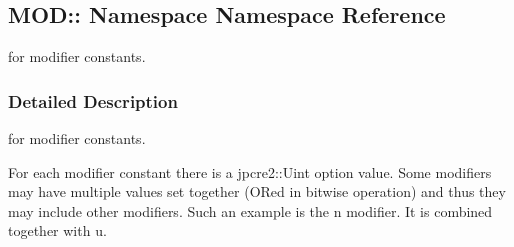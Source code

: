 \hypertarget{namespaceMOD_1_1
Namespace}{}\subsection{M\+OD\+:\+: Namespace Namespace Reference}
\label{namespaceMOD_1_1
Namespace}


for modifier constants.  




\subsubsection{Detailed Description}
for modifier constants. 

For each modifier constant there is a jpcre2\+::\+Uint option value. Some modifiers may have multiple values set together (O\+Red in bitwise operation) and thus they may include other modifiers. Such an example is the \textquotesingle{}n\textquotesingle{} modifier. It is combined together with \textquotesingle{}u\textquotesingle{}. 